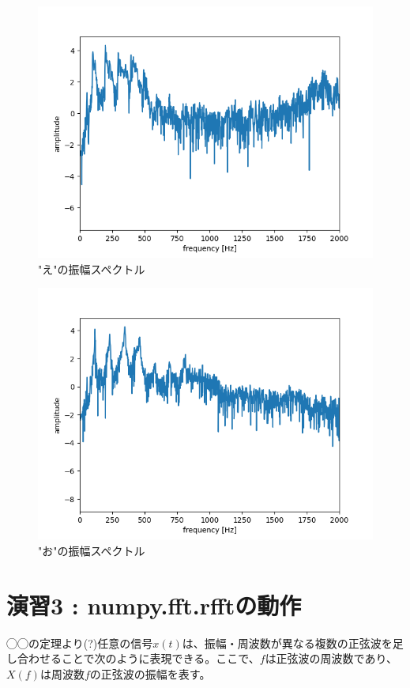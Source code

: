 \documentclass[a4paper,11pt]{jsarticle}
\begin{document}
\begin{figure}[H]
  \centering
  \includegraphics[scale=0.5]{../ex02/img/plot-spectrum-2000_e.png}
  \caption{"え"の振幅スペクトル}
  \label{spectrum_e}
\end{figure}

\begin{figure}[H]
  \centering
  \includegraphics[scale=0.5]{../ex02/img/plot-spectrum-2000_o.png}
  \caption{"お"の振幅スペクトル}
  \label{spectrum_o}
\end{figure}

\section{演習3 : numpy.fft.rfftの動作}
◯◯の定理より(?)任意の信号$x(t)$は、振幅・周波数が異なる複数の正弦波を足し合わせることで次のように表現できる。ここで、$f$は正弦波の周波数であり、$X(f)$は周波数$f$の正弦波の振幅を表す。
\end{document}
